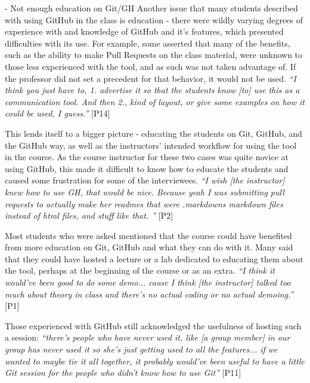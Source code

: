 - Not enough education on Git/GH
Another issue that many students described with using GitHub in the class is education - there were wildly varying degrees of experience with and knowledge of GitHub and it's features, which presented difficulties with its use. For example, some asserted that many of the benefits, such as the ability to make Pull Requests on the class material, were unknown to those less experienced with the tool, and as such was not taken advantage of. If the professor did not set a precedent for that behavior, it would not be used. \textit{``I think you just have to, 1. advertise it so that the students know [to] use this as a communication tool. And then 2., kind of layout, or give some examples on how it could be used, I guess.''} [P14]

This lends itself to a bigger picture - educating the students on Git, GitHub, and the GitHub way, as well as the instructors' intended workflow for using the tool in the course. As the course instructor for these two cases was quite novice at using GitHub, this made it difficult to know how to educate the students and caused some frustration for some of the interviewees. \textit{``I wish [the instructor] knew how to use GH, that would be nice. Because yeah I was submitting pull requests to actually make her readmes that were .markdowns markdown files instead of html files, and stuff like that. ''} [P2]

Most students who were asked mentioned that the course could have benefited from more education on Git, GitHub and what they can do with it. Many said that they could have hosted a lecture or a lab dedicated to educating them about the tool, perhaps at the beginning of the course or as an extra. \textit{``I think it would've been good to do some demo... cause I think [the instructor] talked too much about theory in class and there's no actual coding or no actual demoing.''} [P1]

Those experienced with GitHub still acknowledged the usefulness of hosting such a session: \textit{``there's people who have never used it, like [a group member] in our group has never used it so she's just getting used to all the features... if we wanted to maybe tie it all together, it probably would've been useful to have a little Git session for the people who didn't know how to use Git''} [P11]


